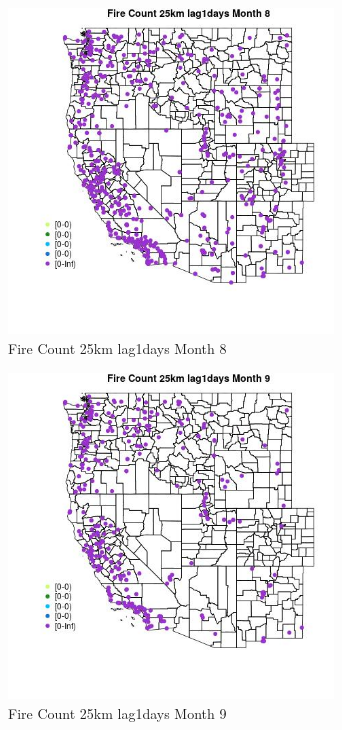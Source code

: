\begin{figure} 
\centering  
\includegraphics[width=0.77\textwidth]{Code_Outputs/Report_ML_input_PM25_Step4_part_e_de_duplicated_aves_compiled_2019-05-18wNAs_MapObsMo8Fire_Count_25km_lag1days.jpg} 
\caption{\label{fig:Report_ML_input_PM25_Step4_part_e_de_duplicated_aves_compiled_2019-05-18wNAsMapObsMo8Fire_Count_25km_lag1days}Fire Count 25km lag1days Month 8} 
\end{figure} 
 

\begin{figure} 
\centering  
\includegraphics[width=0.77\textwidth]{Code_Outputs/Report_ML_input_PM25_Step4_part_e_de_duplicated_aves_compiled_2019-05-18wNAs_MapObsMo9Fire_Count_25km_lag1days.jpg} 
\caption{\label{fig:Report_ML_input_PM25_Step4_part_e_de_duplicated_aves_compiled_2019-05-18wNAsMapObsMo9Fire_Count_25km_lag1days}Fire Count 25km lag1days Month 9} 
\end{figure} 
 

